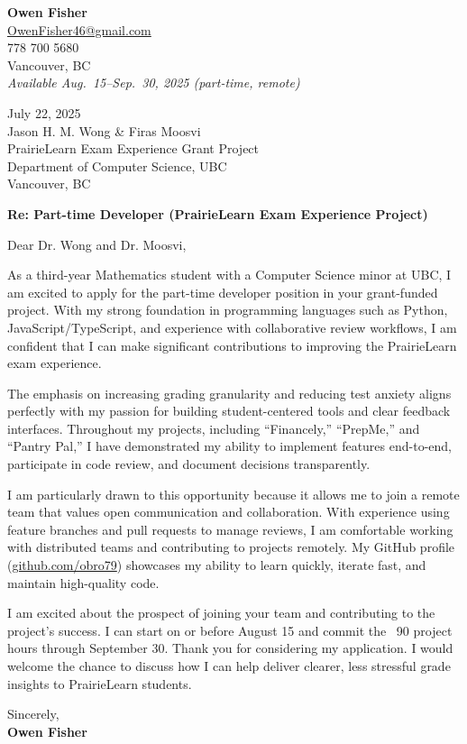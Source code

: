 \documentclass[11pt]{article}
\begin{document}
\noindent
\textbf{Owen Fisher} \\
\href{mailto:OwenFisher46@gmail.com}{OwenFisher46@gmail.com} \\
778 700 5680 \\
Vancouver, BC \\
\emph{Available Aug.\ 15–Sep.\ 30, 2025 (part-time, remote)} \\

\vspace{1em}

\noindent
July 22, 2025 \\
Jason H. M. Wong \& Firas Moosvi \\
PrairieLearn Exam Experience Grant Project \\
Department of Computer Science, UBC \\
Vancouver, BC \\

\vspace{1em}

\noindent
\textbf{Re: Part-time Developer (PrairieLearn Exam Experience Project)} \\

\vspace{1em}

Dear Dr. Wong and Dr. Moosvi,

As a third-year Mathematics student with a Computer Science minor at UBC, I am excited to apply for the part-time developer position in your grant-funded project. With my strong foundation in programming languages such as Python, JavaScript/TypeScript, and experience with collaborative review workflows, I am confident that I can make significant contributions to improving the PrairieLearn exam experience.

The emphasis on increasing grading granularity and reducing test anxiety aligns perfectly with my passion for building student-centered tools and clear feedback interfaces. Throughout my projects, including “Financely,” “PrepMe,” and “Pantry Pal,” I have demonstrated my ability to implement features end-to-end, participate in code review, and document decisions transparently.

I am particularly drawn to this opportunity because it allows me to join a remote team that values open communication and collaboration. With experience using feature branches and pull requests to manage reviews, I am comfortable working with distributed teams and contributing to projects remotely. My GitHub profile (\href{https://github.com/obro79}{github.com/obro79}) showcases my ability to learn quickly, iterate fast, and maintain high-quality code.

I am excited about the prospect of joining your team and contributing to the project's success. I can start on or before August 15 and commit the ~90 project hours through September 30. Thank you for considering my application. I would welcome the chance to discuss how I can help deliver clearer, less stressful grade insights to PrairieLearn students.

\vspace{1em}

Sincerely,\\
\textbf{Owen Fisher}
\end{document}
